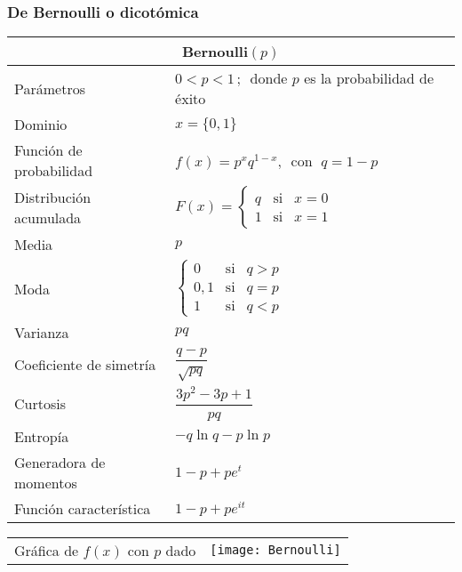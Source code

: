 \documentclass[12pt,a4paper]{article}
\newcommand{\salto}[1][2]{\par\vspace{#1mm}}
\begin{document}
\subsubsection*{De Bernoulli o dicotómica}
\begin{center}
	\begin{tabular}{p{}|p{}}
	\multicolumn{2}{c}{Bernoulli$(p)$} \\
	\hline
	Parámetros & $0 < p < 1\,;\,$ donde $p$ es la probabilidad de éxito \\
	Dominio & $x = \{0,1\}$ \\
	Función de probabilidad & $f(x) = p^x q^{1 - x},\,$ con $\; q = 1 - p$ \\
	Distribución acumulada & $F(x) = \left\{\begin{array}{lcc}
             q & \text{si} & x = 0 \\
             1 & \text{si} & x = 1
             \end{array}\right.$ \\
	Media & $p$ \\
	Moda & $\left\{\begin{array}{lcc}
             0 & \text{si} & q > p \\
             0,1 & \text{si} & q = p \\
             1 & \text{si} & q < p
             \end{array}\right.$ \\
	Varianza & $pq$ \\
	Coeficiente de simetría & $\dfrac{q - p}{\sqrt{pq}}$ \\
	Curtosis & $\dfrac{3p^2 - 3p + 1}{pq}$ \\
	Entropía & $- q\ln q - p\ln p$ \\
	Generadora de momentos & $1 - p + pe^t$ \\
	Función característica & $1 - p + pe^{it}$
	\end{tabular}
	\begin{tabular}{p{}|p{}}
	\vspace{0.25cm}Gráfica de $f(x)$ con $p$ dado & \vspace{0.1mm}\texttt{[image: Bernoulli]}
	\end{tabular}
\end{center}
\salto[20]
\end{document}
